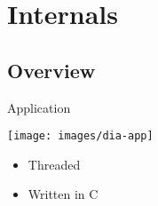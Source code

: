 \documentclass{beamer}
\begin{document}
\section{Internals}
\subsection{Overview}
\begin{frame}{Application}
	\begin{center}
	\texttt{[image: images/dia-app]}
	\end{center}
	\begin{itemize}
	\item Threaded
	\item Written in C
	\end{itemize}
\end{frame}
\end{document}

